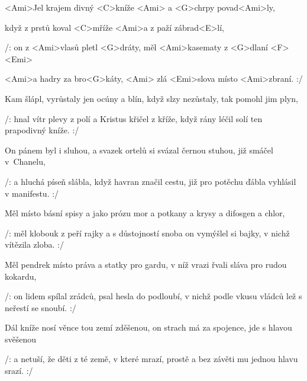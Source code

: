 

\zs
<Ami>Jel krajem divný <C>kníže <Ami> a <G>chrpy povad<Ami>ly,

když z prstů koval <C>mříže <Ami>a z paží zábrad<E>lí,

/: on z <Ami>vlasů pletl <G>dráty, měl <Ami>kasematy z <G>dlaní <F> <Emi>

<Ami>a hadry za bro<G>káty, <Ami> zlá <Emi>slova místo <Ami>zbraní. :/
\ks

\zs
Kam šlápl, vyrůstaly jen ocúny a blín, když slzy nezůstaly, tak pomohl jim plyn,

/: hnal vítr plevy z polí a Kristus křičel z kříže, když rány léčil solí ten prapodivný kníže. :/
\ks

\zs
On pánem byl i sluhou, a svazek ortelů si svázal černou stuhou, již smáčel v~Chanelu,

/: a hluchá píseň slábla, když havran značil cestu, již pro potěchu ďábla vyhlásil v manifestu. :/
\ks

\zs
Měl místo básní spisy a jako prózu mor a potkany a krysy a difosgen a chlor,

/: měl klobouk z peří rajky a s důstojností snoba on vymýšlel si bajky, v nichž vítězila zloba. :/
\ks

\zs
Měl pendrek místo práva a statky pro gardu, v níž vrazi řvali sláva pro rudou kokardu,

/: on lidem spílal zrádců, psal hesla do podloubí, v nichž podle vkusu vládců lež s neřestí se snoubí. :/
\ks

\zs
Dál kníže nosí věnce tou zemí zděšenou, on strach má za spojence, jde s hlavou svěšenou

/: a netuší, že děti z té země, v které mrazí, prostě a bez závěti mu jednou hlavu srazí. :/
\ks

\kp
